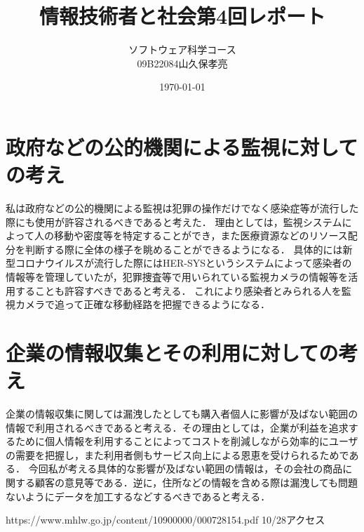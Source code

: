 \documentclass[dvipdfmx]{jarticle}
\title{情報技術者と社会第4回レポート}
\author{ソフトウェア科学コース\\09B22084山久保孝亮}
\date{\today}
\begin{document}
\maketitle
\section{政府などの公的機関による監視に対しての考え}
私は政府などの公的機関による監視は犯罪の操作だけでなく感染症等が流行した際にも使用が許容されるべきであると考えた．
理由としては，監視システムによって人の移動や密度等を特定することができ，また医療資源などのリソース配分を判断する際に全体の様子を眺めることができるようになる．
具体的には新型コロナウイルスが流行した際にはHER-SYSというシステムによって感染者の情報等を管理していた\cite{1}が，犯罪捜査等で用いられている監視カメラの情報等を活用することも許容すべきであると考える．
これにより感染者とみられる人を監視カメラで追って正確な移動経路を把握できるようになる．
\section{企業の情報収集とその利用に対しての考え}
企業の情報収集に関しては漏洩したとしても購入者個人に影響が及ばない範囲の情報で利用されるべきであると考える．その理由としては，企業が利益を追求するために個人情報を利用することによってコストを削減しながら効率的にユーザの需要を把握し，また利用者側もサービス向上による恩恵を受けられるためである．
今回私が考える具体的な影響が及ばない範囲の情報は，その会社の商品に関する顧客の意見等である．逆に，住所などの情報を含める際は漏洩しても問題ないようにデータを加工するなどするべきであると考える．
\begin{thebibliography}{99}
     https://www.mhlw.go.jp/content/10900000/000728154.pdf 10/28アクセス

\end{thebibliography}
\end{document}
